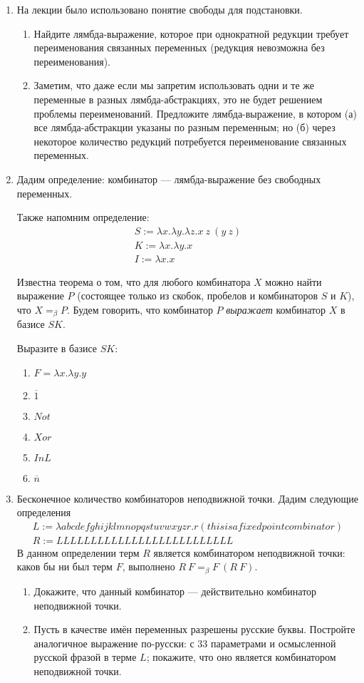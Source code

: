 \documentclass[10pt,a4paper,oneside]{article}
\begin{document}
\begin{enumerate}
\item На лекции было использовано понятие свободы для подстановки. 
\begin{enumerate}
\item Найдите лямбда-выражение, которое при однократной редукции требует переименования связанных переменных
(редукция невозможна без переименования). 
\item Заметим, что даже если мы запретим использовать одни и те же переменные в разных лямбда-абстракциях,
это не будет решением проблемы переименований. Предложите лямбда-выражение, в котором (а) все лямбда-абстракции
указаны по разным переменным; но (б) через некоторое количество редукций потребуется переименование
связанных переменных.
\end{enumerate}

\item Дадим определение: комбинатор --- лямбда-выражение без свободных переменных.

Также напомним определение:
$$\begin{array}{l}
S := \lambda x.\lambda y.\lambda z.x\ z\ (y\ z)\\
K := \lambda x.\lambda y.x\\
I := \lambda x.x
\end{array}$$

Известна теорема о том, что для любого комбинатора $X$ можно найти выражение $P$
(состоящее только из скобок, пробелов и комбинаторов $S$ и $K$), что $X =_\beta P$.
Будем говорить, что комбинатор $P$ \emph{выражает} комбинатор $X$ в базисе $SK$.

Выразите в базисе $SK$:
\begin{enumerate}
\item $F = \lambda x.\lambda y.y$
\item $\overline{1}$
\item $Not$
\item $Xor$
\item $InL$
\item $\overline{n}$
\end{enumerate}

\item Бесконечное количество комбинаторов неподвижной точки. Дадим следующие определения
$$\begin{array}{l}
L := \lambda abcdefghijklmnopqstuvwxyzr.r(thisisafixedpointcombinator)\\
R := LLLLLLLLLLLLLLLLLLLLLLLLLL\end{array}$$
В данном определении терм $R$ является комбинатором неподвижной точки: каков бы ни был терм
$F$, выполнено $R\ F =_\beta F\ (R\ F)$.
\begin{enumerate}
\item Докажите, что данный комбинатор --- действительно комбинатор неподвижной точки.
\item Пусть в качестве имён переменных разрешены русские буквы. Постройте аналогичное выражение
по-русски: с 33 параметрами и осмысленной русской фразой в терме $L$; покажите, что оно является
комбинатором неподвижной точки.
\end{enumerate}


\end{enumerate}
\end{document}
